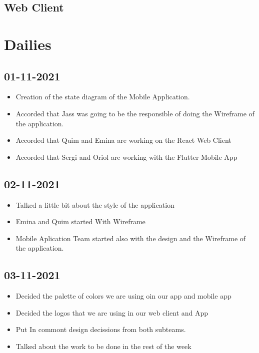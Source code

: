 \documentclass[./main.tex]{subfiles}
\begin{document}
\subsection{Web Client}

\section{Dailies}

\subsection{01-11-2021}
\begin{itemize}
\item Creation of the state diagram of the Mobile Application.
\item Accorded that Jass was going to be the responsible of doing the Wireframe of the application.
\item Accorded that Quim and Emina are working on the React Web Client
\item Accorded that Sergi and Oriol are working with the Flutter Mobile App
\end{itemize}

\subsection{02-11-2021}
\begin{itemize}
\item Talked a little bit about the style of the application
\item Emina and Quim started With Wireframe
\item Mobile Aplication Team started also with the design and the Wireframe of the application.
\end{itemize}

\subsection{03-11-2021}
\begin{itemize}
\item Decided the palette of colors we are using oin our app and mobile app
\item Decided the logos that we are using in our web client and App
\item Put In commont design decissions from both subteams.
\item Talked about the work to be done in the rest of the week
\end{itemize}
\end{document}
